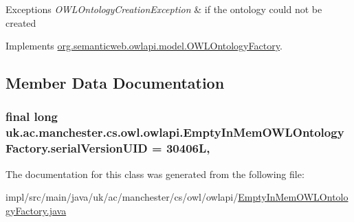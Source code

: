 \begin{DoxyExceptions}{Exceptions}
{\em O\-W\-L\-Ontology\-Creation\-Exception} & if the ontology could not be created \\
\hline
\end{DoxyExceptions}


Implements \hyperlink{interfaceorg_1_1semanticweb_1_1owlapi_1_1model_1_1_o_w_l_ontology_factory_a4870a6a6701141ec76c448050f9105d6}{org.\-semanticweb.\-owlapi.\-model.\-O\-W\-L\-Ontology\-Factory}.



\subsection{Member Data Documentation}
\hypertarget{classuk_1_1ac_1_1manchester_1_1cs_1_1owl_1_1owlapi_1_1_empty_in_mem_o_w_l_ontology_factory_adea5acaa84278655845341125e6cab5f}{
\subsubsection[{serial\-Version\-U\-I\-D}]{\setlength{\rightskip}{0pt plus 5cm}final long uk.\-ac.\-manchester.\-cs.\-owl.\-owlapi.\-Empty\-In\-Mem\-O\-W\-L\-Ontology\-Factory.\-serial\-Version\-U\-I\-D = 30406\-L\hspace{0.3cm}{\ttfamily [static]}, {\ttfamily [private]}}}\label{classuk_1_1ac_1_1manchester_1_1cs_1_1owl_1_1owlapi_1_1_empty_in_mem_o_w_l_ontology_factory_adea5acaa84278655845341125e6cab5f}


The documentation for this class was generated from the following file\-:\begin{DoxyCompactItemize}
\item 
impl/src/main/java/uk/ac/manchester/cs/owl/owlapi/\hyperlink{_empty_in_mem_o_w_l_ontology_factory_8java}{Empty\-In\-Mem\-O\-W\-L\-Ontology\-Factory.\-java}\end{DoxyCompactItemize}
